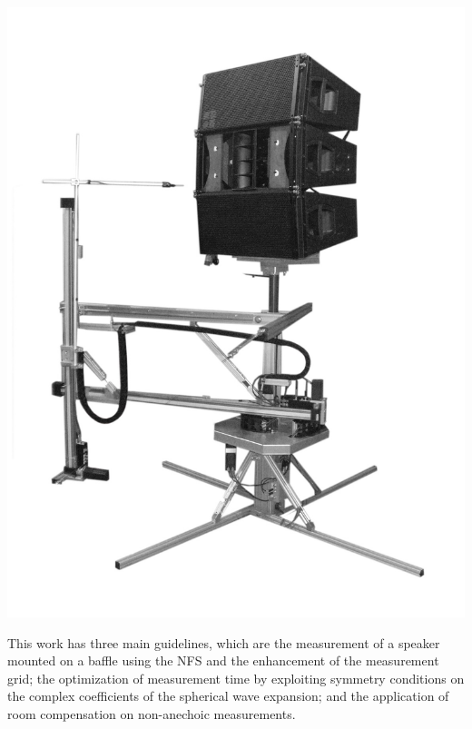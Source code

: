 \documentclass{report}
\begin{document}
\begin{minipage}{0.4\textwidth}
\begin{center}
	\includegraphics[scale=0.13]{Preface/NFS2} 
    \captionsetup{hypcap=false} 
	\label{fig:nfs}
\end{center}
\end{minipage}\newline

This work has three main guidelines, which are the measurement of a speaker mounted on a baffle using the NFS and the enhancement of the measurement grid; the optimization of measurement time by exploiting symmetry conditions on the complex coefficients of the spherical wave expansion; and the application of room compensation on non-anechoic measurements.\\
\end{document}
